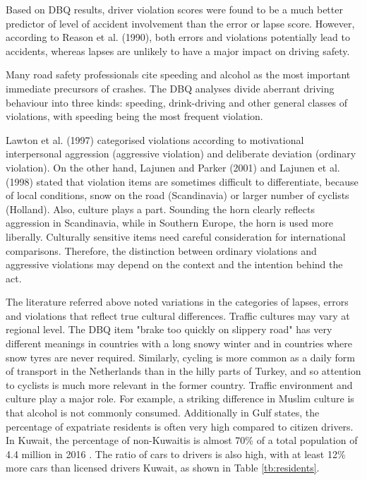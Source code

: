 \documentclass[preprint,12pt,a4paper,authoryear]{elsarticle}
\begin{document}
Based on DBQ results, driver violation scores were found to be a much better predictor of level of accident involvement than the error or lapse score. However, according to Reason et al. (1990), both errors and violations potentially lead to accidents, whereas lapses are unlikely to have a major impact on driving safety.    

Many road safety professionals cite speeding and alcohol as the most important immediate precursors of crashes. The DBQ analyses divide aberrant driving behaviour into three kinds: speeding, drink-driving and other general classes of violations, with speeding being the most frequent violation. 

Lawton et al. (1997) categorised violations according to motivational interpersonal aggression (aggressive violation) and deliberate deviation (ordinary violation). On the other hand, Lajunen and Parker (2001) and Lajunen et al. (1998) stated that violation items are sometimes difficult to differentiate, because of local conditions, snow on the road (Scandinavia) or larger number of cyclists (Holland). Also, culture plays a part. Sounding the horn clearly reflects aggression in Scandinavia, while in Southern Europe, the horn is used more liberally. Culturally sensitive items need careful consideration for international comparisons. Therefore, the distinction between ordinary violations and aggressive violations may depend on the context and the intention behind the act.   

The literature referred above noted variations in the categories of lapses, errors and violations that reflect true cultural differences. Traffic cultures may vary at regional level. The DBQ item "brake too quickly on slippery road" has very different meanings in countries with a long snowy winter and in countries where snow tyres are never required. Similarly, cycling is more common as a daily form of transport in the Netherlands than in the hilly parts of Turkey, and so attention to cyclists is much more relevant in the former country. Traffic environment and culture play a major role. For example, a striking difference in Muslim culture is that alcohol is not commonly consumed.  Additionally in Gulf states, the percentage of expatriate residents is often very high compared to citizen drivers. In Kuwait, the percentage of non-Kuwaitis is almost 70\% of a total population of 4.4 million in 2016 \citep{PACI2017}. The ratio of cars to drivers is also high, with at least 12\% more cars than licensed drivers Kuwait, as shown in Table \ref{tb:residents}.
\end{document}
